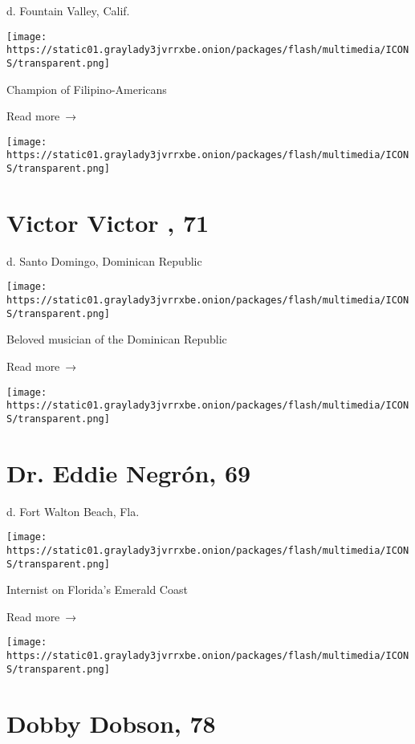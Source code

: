 d. Fountain Valley, Calif.

\texttt{[image: https://static01.graylady3jvrrxbe.onion/packages/flash/multimedia/ICONS/transparent.png]}

Champion of Filipino-Americans

 Read more~→

\href{https://www.nytimes3xbfgragh.onion/2020/08/01/obituaries/victor-victor-dead-coronavirus.html}{}

\texttt{[image: https://static01.graylady3jvrrxbe.onion/packages/flash/multimedia/ICONS/transparent.png]}

\hypertarget{victor-victor--71}{%
\section{Victor Victor , 71}\label{victor-victor--71}}

d. Santo Domingo, Dominican Republic

\texttt{[image: https://static01.graylady3jvrrxbe.onion/packages/flash/multimedia/ICONS/transparent.png]}

Beloved musician of the Dominican Republic

 Read more~→

\href{https://www.nytimes3xbfgragh.onion/2020/08/01/obituaries/eddie-negron-dead-coronavirus.html}{}

\texttt{[image: https://static01.graylady3jvrrxbe.onion/packages/flash/multimedia/ICONS/transparent.png]}

\hypertarget{dr-eddie-negruxf3n-69}{%
\section{Dr. Eddie Negrón, 69}\label{dr-eddie-negruxf3n-69}}

d. Fort Walton Beach, Fla.

\texttt{[image: https://static01.graylady3jvrrxbe.onion/packages/flash/multimedia/ICONS/transparent.png]}

Internist on Florida's Emerald Coast

 Read more~→

\href{https://www.nytimes3xbfgragh.onion/2020/07/31/obituaries/dobby-dobson-dead-coronavirus.html}{}

\texttt{[image: https://static01.graylady3jvrrxbe.onion/packages/flash/multimedia/ICONS/transparent.png]}

\hypertarget{dobby-dobson-78}{%
\section{Dobby Dobson, 78}\label{dobby-dobson-78}}

